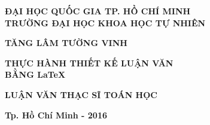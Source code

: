 \begin{titlepage}
\begin{center}
{\bf  ĐẠI HỌC QUỐC GIA TP. HỒ CHÍ MINH}\\
{\bf TRƯỜNG ĐẠI HỌC KHOA HỌC TỰ NHIÊN}\\
\hfill

\vspace*{2.5cm}

{\large\bf  TĂNG LÂM TƯỜNG VINH}

\vspace*{4cm}

\begin{center}
	{\huge\bf THỰC HÀNH THIẾT KẾ LUẬN VĂN\\ BẰNG  \LaTeX}
\end{center}


\vspace*{3cm}

{\large\bf LUẬN VĂN THẠC SĨ TOÁN HỌC}


\vfill

{\bf Tp. Hồ Chí Minh - 2016}
\end{center}
\end{titlepage}

